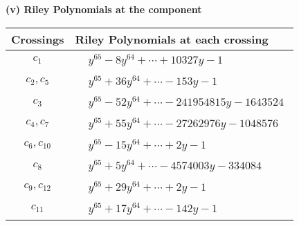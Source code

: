 \documentclass[1p]{elsarticle_modified}
\theoremstyle{definition}
\begin{document}
\newpage\renewcommand{\arraystretch}{1}
\flushleft \textbf{(v) Riley Polynomials at the component}\newline \\
\begin{tabular}{m{50pt}|m{274pt}}
Crossings & \hspace{64pt}Riley Polynomials at each crossing \\
\hline $$\begin{aligned}c_{1}\end{aligned}$$&$\begin{aligned}
&y^{65}-8 y^{64}+\cdots+10327 y-1
\end{aligned}$\\
\hline $$\begin{aligned}c_{2},c_{5}\end{aligned}$$&$\begin{aligned}
&y^{65}+36 y^{64}+\cdots-153 y-1
\end{aligned}$\\
\hline $$\begin{aligned}c_{3}\end{aligned}$$&$\begin{aligned}
&y^{65}-52 y^{64}+\cdots-241954815 y-1643524
\end{aligned}$\\
\hline $$\begin{aligned}c_{4},c_{7}\end{aligned}$$&$\begin{aligned}
&y^{65}+55 y^{64}+\cdots-27262976 y-1048576
\end{aligned}$\\
\hline $$\begin{aligned}c_{6},c_{10}\end{aligned}$$&$\begin{aligned}
&y^{65}-15 y^{64}+\cdots+2 y-1
\end{aligned}$\\
\hline $$\begin{aligned}c_{8}\end{aligned}$$&$\begin{aligned}
&y^{65}+5 y^{64}+\cdots-4574003 y-334084
\end{aligned}$\\
\hline $$\begin{aligned}c_{9},c_{12}\end{aligned}$$&$\begin{aligned}
&y^{65}+29 y^{64}+\cdots+2 y-1
\end{aligned}$\\
\hline $$\begin{aligned}c_{11}\end{aligned}$$&$\begin{aligned}
&y^{65}+17 y^{64}+\cdots-142 y-1
\end{aligned}$\\
\hline
\end{tabular}\\~\\
\end{document}
